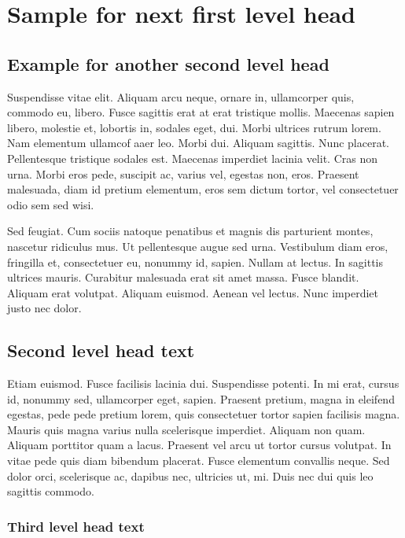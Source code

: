 \documentclass[AMS,STIX2COL]{WileyNJD-v2}
\begin{document}
    \section{Sample for next first level head}\label{sec3}

    \subsection{Example for another second level head}

    Suspendisse vitae elit. Aliquam arcu neque, ornare in, ullamcorper quis, commodo eu, libero. Fusce sagittis erat at
    erat tristique mollis. Maecenas sapien libero, molestie et, lobortis in, sodales eget, dui. Morbi ultrices rutrum lorem.
    Nam elementum ullamcof aaer leo. Morbi dui. Aliquam sagittis. Nunc placerat. Pellentesque tristique sodales est.
    Maecenas imperdiet lacinia velit. Cras non urna. Morbi eros pede, suscipit ac, varius vel, egestas non, eros. Praesent
    malesuada, diam id pretium elementum, eros sem dictum tortor, vel consectetuer odio sem sed wisi.

    Sed feugiat. Cum sociis natoque penatibus et magnis dis parturient montes, nascetur ridiculus mus. Ut pellentesque
    augue sed urna. Vestibulum diam eros, fringilla et, consectetuer eu, nonummy id, sapien. Nullam at lectus. In sagittis
    ultrices mauris. Curabitur malesuada erat sit amet massa. Fusce blandit. Aliquam erat volutpat. Aliquam euismod.
    Aenean vel lectus. Nunc imperdiet justo nec dolor.

    \subsection{Second level head text}

    Etiam euismod. Fusce facilisis lacinia dui. Suspendisse potenti. In mi erat, cursus id, nonummy sed, ullamcorper
    eget, sapien. Praesent pretium, magna in eleifend egestas, pede pede pretium lorem, quis consectetuer tortor sapien
    facilisis magna. Mauris quis magna varius nulla scelerisque imperdiet. Aliquam non quam. Aliquam porttitor quam
    a lacus. Praesent vel arcu ut tortor cursus volutpat. In vitae pede quis diam bibendum placerat. Fusce elementum
    convallis neque. Sed dolor orci, scelerisque ac, dapibus nec, ultricies ut, mi. Duis nec dui quis leo sagittis commodo.

    \subsubsection{Third level head text}
\end{document}
